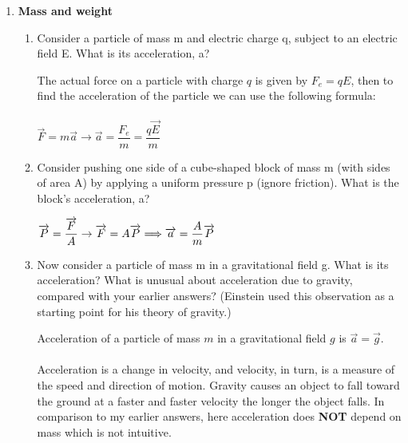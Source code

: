 \documentclass[fleqn]{article}
\begin{document}
  \begin{enumerate}
    \item \textbf{Mass and weight}
    \begin{enumerate}
      \item Consider a particle of mass m and electric charge q, subject to an electric field E. What is its acceleration, a?

      \textcolor{hwColor}{
        The actual force on a particle with charge $q$ is given by $F_e=qE$, then to find the acceleration of the particle
        we can use the following formula: \\
        \\
        $
          \overrightarrow{F}=m\overrightarrow{a} \rightarrow \overrightarrow{a}=\dfrac{F_e}{m}=\dfrac{q\overrightarrow{E}}{m}
        $
      }

      \item Consider pushing one side of a cube-shaped block of mass m (with sides of area A) by applying a uniform pressure p (ignore friction).
      What is the block’s acceleration, a?

        \textcolor{hwColor}{
          $
            \overrightarrow{P}=\dfrac{\overrightarrow{F}}{A} \rightarrow \overrightarrow{F}=A\overrightarrow{P} \\
            \\
            \\
            \Longrightarrow \overrightarrow{a}=\dfrac{A}{m}\overrightarrow{P}
          $
        }

      \item Now consider a particle of mass m in a gravitational field g. What is its acceleration? What is unusual about acceleration due to
      gravity, compared with your earlier answers? (Einstein used this observation as a starting point for his theory of gravity.)

        \textcolor{hwColor}{
          Acceleration of a particle of mass $m$ in a gravitational field $g$ is $\overrightarrow{a}=\overrightarrow{g}$. \\
          \\
          Acceleration is a change in velocity, and velocity, in turn, is a measure of the speed and direction of motion. 
          Gravity causes an object to fall toward the ground at a faster and faster velocity the longer the object falls.
          In comparison to my earlier answers, here acceleration does \textbf{NOT} depend on mass which is not intuitive.
        }



\end{enumerate}
\end{enumerate}
\end{document}
